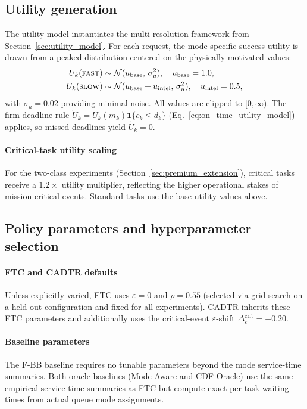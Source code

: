 \documentclass[fleqn,12pt,lineno]{wlpeerj}
\begin{document}
\subsection{Utility generation}
\label{sec:utility_generation}

The utility model instantiates the multi-resolution framework from Section~\ref{sec:utility_model}. For each request, the mode-specific success utility is drawn from a peaked distribution centered on the physically motivated values:
\begin{align*}
U_k(\textsc{fast}) &\sim \mathcal{N}(u_{\mathrm{base}},\, \sigma_u^2), \quad u_{\mathrm{base}} = 1.0,\\
U_k(\textsc{slow}) &\sim \mathcal{N}(u_{\mathrm{base}} + u_{\mathrm{intel}},\, \sigma_u^2), \quad u_{\mathrm{intel}} = 0.5,
\end{align*}
with $\sigma_u = 0.02$ providing minimal noise. All values are clipped to $[0, \infty)$. The firm-deadline rule $\tilde{U}_k = U_k(m_k)\mathbf{1}\{c_k \le d_k\}$ (Eq.~\eqref{eq:on_time_utility_model}) applies, so missed deadlines yield $\tilde{U}_k = 0$.

\paragraph{Critical-task utility scaling}
For the two-class experiments (Section~\ref{sec:premium_extension}), critical tasks receive a $1.2\times$ utility multiplier, reflecting the higher operational stakes of mission-critical events. Standard tasks use the base utility values above.

\subsection{Policy parameters and hyperparameter selection}
\label{sec:hyperparams}

\paragraph{FTC and CADTR defaults}
Unless explicitly varied, FTC uses $\varepsilon=0$ and $\rho=0.55$ (selected via grid search on a held-out configuration and fixed for all experiments). CADTR inherits these FTC parameters and additionally uses the critical-event $\varepsilon$-shift $\Delta_{\varepsilon}^{\mathrm{crit}} = -0.20$.

\paragraph{Baseline parameters}
The F-BB baseline requires no tunable parameters beyond the mode service-time summaries. Both oracle baselines (Mode-Aware and CDF Oracle) use the same empirical service-time summaries as FTC but compute exact per-task waiting times from actual queue mode assignments.
\end{document}
